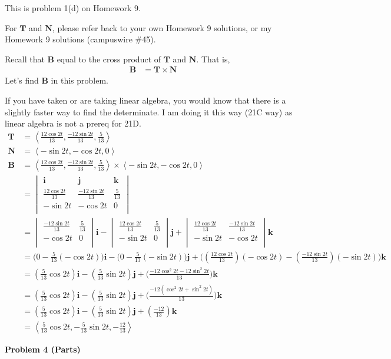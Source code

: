 \documentclass{article}
\newcommand{\lrp}[1]{\left( #1 \right)}
\newcommand{\lra}[1]{\left\langle #1 \right\rangle}
\renewcommand{\i}[0]{\mathbf{i}}
\renewcommand{\j}[0]{\mathbf{j}}
\renewcommand{\k}[0]{\mathbf{k}}
\newcommand{\T}[0]{\mathbf{T}}
\newcommand{\N}[0]{\mathbf{N}}
\newcommand{\B}[0]{\mathbf{B}}
\begin{document}
This is problem 1(d) on Homework 9.

For $\T$ and $\N$, please refer back to your own Homework 9 solutions, or my Homework 9 solutions (campuswire \#45).

Recall that $\B$ equal to the cross product of $\T$ and $\N$. That is,
\begin{align*}
    \B&=\T \times \N
\end{align*}
Let's find $\B$ in this problem.

If you have taken or are taking linear algebra, you would know that there is a slightly faster way to find the determinate. I am doing it this way (21C way) as linear algebra is not a prereq for 21D.
\begin{align*}
    \T&=\lra{\frac{12\cos 2t}{13},\frac{-12\sin 2t}{13},\frac{5}{13}}\\
    \N&=\lra{-\sin 2t, -\cos 2t, 0}\\
    \B&=\lra{\frac{12\cos 2t}{13},\frac{-12\sin 2t}{13},\frac{5}{13}}\times \lra{-\sin 2t, -\cos 2t, 0}\\
    &=\begin{vmatrix}
\mathbf{i} & \mathbf{j} & \mathbf{k}\\
\frac{12\cos 2t}{13} & \frac{-12\sin 2t}{13} & \frac{5}{13}\\
-\sin 2t & -\cos 2t & 0\\
\end{vmatrix}\\
&=\begin{vmatrix}
\frac{-12\sin 2t}{13} & \frac{5}{13}\\
-\cos 2t & 0\\
\end{vmatrix}\mathbf{i}-
\begin{vmatrix}
\frac{12\cos 2t}{13} & \frac{5}{13}\\
-\sin 2t & 0\\
\end{vmatrix}\mathbf{j}+
\begin{vmatrix}
\frac{12\cos 2t}{13} & \frac{-12\sin 2t}{13}\\
-\sin 2t & -\cos 2t\\
\end{vmatrix}\mathbf{k}\\
&=\Bigg(0-\frac{5}{13}\lrp{-\cos 2t}\Bigg)\i-\Bigg(0-\frac{5}{13}\lrp{-\sin 2t}\Bigg)\j+\Bigg(\left(\frac{12\cos 2t}{13}\right)\left(-\cos 2t\right)-\left(\frac{-12\sin 2t}{13}\right)\left(-\sin 2t\right)\Bigg)\mathbf{k}\\
&=\lrp{\frac{5}{13}\cos 2t}\i-\lrp{\frac{5}{13}\sin 2t}\j+\Bigg(\frac{-12\cos^2 2t-12\sin^2 2t}{13}\Bigg)\k\\
&=\lrp{\frac{5}{13}\cos 2t}\i-\lrp{\frac{5}{13}\sin 2t}\j+\Bigg(\frac{-12(\cos^2 2t+\sin^2 2t)}{13}\Bigg)\k\\
&=\lrp{\frac{5}{13}\cos 2t}\i-\lrp{\frac{5}{13}\sin 2t}\j+\lrp{\frac{-12}{13}}\k\tag{$\sin^2 2t+\cos^2 2t=1$}\\
&=\boxed{\lra{\frac{5}{13}\cos 2t,-\frac{5}{13}\sin 2t,-\frac{12}{13}}}
\end{align*}
{}\textbf{Problem 4 (Parts)} 
\end{document}
